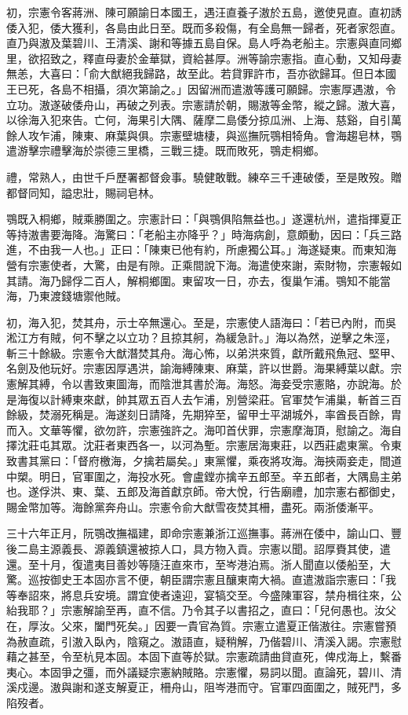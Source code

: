 \begin{pinyinscope}
初，宗憲令客蔣洲、陳可願諭日本國王，遇汪直養子滶於五島，邀使見直。直初誘倭入犯，倭大獲利，各島由此日至。既而多殺傷，有全島無一歸者，死者家怨直。直乃與滶及葉碧川、王清溪、謝和等據五島自保。島人呼為老船主。宗憲與直同鄉里，欲招致之，釋直母妻於金華獄，資給甚厚。洲等諭宗憲指。直心動，又知母妻無恙，大喜曰：「俞大猷絕我歸路，故至此。若貸罪許市，吾亦欲歸耳。但日本國王已死，各島不相攝，須次第諭之。」因留洲而遣滶等護可願歸。宗憲厚遇滶，令立功。滶遂破倭舟山，再破之列表。宗憲請於朝，賜滶等金幣，縱之歸。滶大喜，以徐海入犯來告。亡何，海果引大隅、薩摩二島倭分掠瓜洲、上海、慈谿，自引萬餘人攻乍浦，陳東、麻葉與俱。宗憲壁塘棲，與巡撫阮鶚相犄角。會海趨皂林，鶚遣游擊宗禮擊海於崇德三里橋，三戰三捷。既而敗死，鶚走桐鄉。

禮，常熟人，由世千戶歷署都督僉事。驍健敢戰。練卒三千連破倭，至是敗歿。贈都督同知，謚忠壯，賜祠皂林。

鶚既入桐鄉，賊乘勝圍之。宗憲計曰：「與鶚俱陷無益也。」遂還杭州，遣指揮夏正等持滶書要海降。海驚曰：「老船主亦降乎？」時海病創，意頗動，因曰：「兵三路進，不由我一人也。」正曰：「陳東已他有約，所慮獨公耳。」海遂疑東。而東知海營有宗憲使者，大驚，由是有隙。正乘間說下海。海遣使來謝，索財物，宗憲報如其請。海乃歸俘二百人，解桐鄉圍。東留攻一日，亦去，復巢乍浦。鶚知不能當海，乃東渡錢塘禦他賊。

初，海入犯，焚其舟，示士卒無還心。至是，宗憲使人語海曰：「若已內附，而吳淞江方有賊，何不擊之以立功？且掠其舸，為緩急計。」海以為然，逆擊之朱涇，斬三十餘級。宗憲令大猷潛焚其舟。海心怖，以弟洪來質，獻所戴飛魚冠、堅甲、名劍及他玩好。宗憲因厚遇洪，諭海縛陳東、麻葉，許以世爵。海果縛葉以獻。宗憲解其縛，令以書致東圖海，而陰泄其書於海。海怒。海妾受宗憲賂，亦說海。於是海復以計縛東來獻，帥其眾五百人去乍浦，別營梁莊。官軍焚乍浦巢，斬首三百餘級，焚溺死稱是。海遂刻日請降，先期猝至，留甲士平湖城外，率酋長百餘，胄而入。文華等懼，欲勿許，宗憲強許之。海叩首伏罪，宗憲摩海頂，慰諭之。海自擇沈莊屯其眾。沈莊者東西各一，以河為塹。宗憲居海東莊，以西莊處東黨。令東致書其黨曰：「督府檄海，夕擒若屬矣。」東黨懼，乘夜將攻海。海挾兩妾走，間道中槊。明日，官軍圍之，海投水死。會盧鏜亦擒辛五郎至。辛五郎者，大隅島主弟也。遂俘洪、東、葉、五郎及海首獻京師。帝大悅，行告廟禮，加宗憲右都御史，賜金幣加等。海餘黨奔舟山。宗憲令俞大猷雪夜焚其柵，盡死。兩浙倭漸平。

三十六年正月，阮鶚改撫福建，即命宗憲兼浙江巡撫事。蔣洲在倭中，諭山口、豐後二島主源義長、源義鎮還被掠人口，具方物入貢。宗憲以聞。詔厚賚其使，遣還。至十月，復遣夷目善妙等隨汪直來市，至岑港泊焉。浙人聞直以倭船至，大驚。巡按御史王本固亦言不便，朝臣謂宗憲且釀東南大禍。直遣滶詣宗憲曰：「我等奉詔來，將息兵安境。謂宜使者遠迎，宴犒交至。今盛陳軍容，禁舟楫往來，公紿我耶？」宗憲解諭至再，直不信。乃令其子以書招之，直曰：「兒何愚也。汝父在，厚汝。父來，闔門死矣。」因要一貴官為質。宗憲立遣夏正偕滶往。宗憲嘗預為赦直疏，引滶入臥內，陰窺之。滶語直，疑稍解，乃偕碧川、清溪入謁。宗憲慰藉之甚至，令至杭見本固。本固下直等於獄。宗憲疏請曲貸直死，俾戍海上，繫番夷心。本固爭之彊，而外議疑宗憲納賊賂。宗憲懼，易詞以聞。直論死，碧川、清溪戍邊。滶與謝和遂支解夏正，柵舟山，阻岑港而守。官軍四面圍之，賊死鬥，多陷歿者。


\end{pinyinscope}
